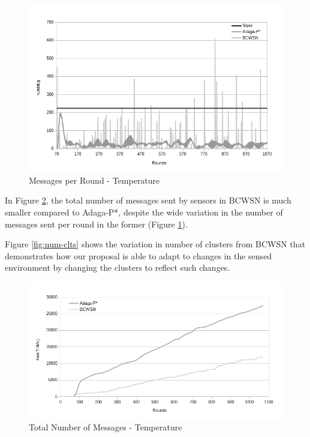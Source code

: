 \documentclass{acm_proc_article-sp}
\begin{document}
\begin{figure}[!htb]
\begin{center}
	\includegraphics[scale=0.4]{BCWSN-NumMsgPerRoundxRound-PB.png}
	 \vspace*{-.6cm}
    \caption{Messages per Round - Temperature}

    \label{fig:num-msg}
\end{center}
\end{figure}

In Figure \ref{fig:tot-num-msg}, the total number of messages sent by sensors in
BCWSN is much smaller compared to Adaga-P*, despite the wide variation in the
number of messages sent per round in the former (Figure \ref{fig:num-msg}).

Figure \ref{fig:num-clts} shows the variation in number of clusters from BCWSN 
that demonstrates how our proposal is able to adapt to changes in the sensed 
environment by changing the clusters to reflect such changes.

\begin{figure}[!htb]
\begin{center}
	\includegraphics[scale=0.40]{BCWSN-TotNumMsgxRound-PB-2Appr.png}
	 \vspace*{-.6cm}
    \caption{Total Number of Messages - Temperature}
    \label{fig:tot-num-msg}
\end{center}
\end{figure}
\vspace*{-.3cm}
\end{document}
